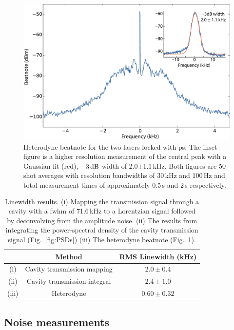\begin{figure}[htbp]
\centering
\includegraphics[width=\linewidth]{chapter1/Figs/fig5_v1.pdf}
\caption{Heterodyne beatnote for the two lasers locked with \gls*{ps}. The inset figure is a higher resolution measurement of the central peak with a Gaussian fit (red), $-3\rm\,dB$ width of 2.0$\pm$1.1\,kHz. Both figures are 50 shot averages with resolution bandwidths of 30\,kHz and 100\,Hz and total measurement times of approximately 0.5\,s and 2\,s respectively.}
\label{beatnote}
\end{figure}

\begin{table}[htbp]
\centering
\begin{tabular}{c c c}
\hline
  & Method & RMS Linewidth (kHz) \\ \hline
  (i) & Cavity transmission mapping  & $2.0 \pm 0.4$ \\
  (ii) &Cavity transmission integral & $2.4 \pm 1.0$ \\
  (iii) & Heterodyne & $0.60\pm0.32$ \\ \hline\end{tabular}
\caption{Linewidth results. (i) Mapping the transmission signal through a cavity with a \gls*{fwhm} of 71.6\,kHz to a Lorentzian signal followed by deconvolving from the amplitude noise. (ii) The results from integrating the power-spectral density of the cavity transmission signal (Fig.~\ref{fig:PSDs}) (iii) The heterodyne beatnote (Fig.~\ref{beatnote}).}
\label{linewidth_table}
\end{table}

\subsection{Noise measurements}
